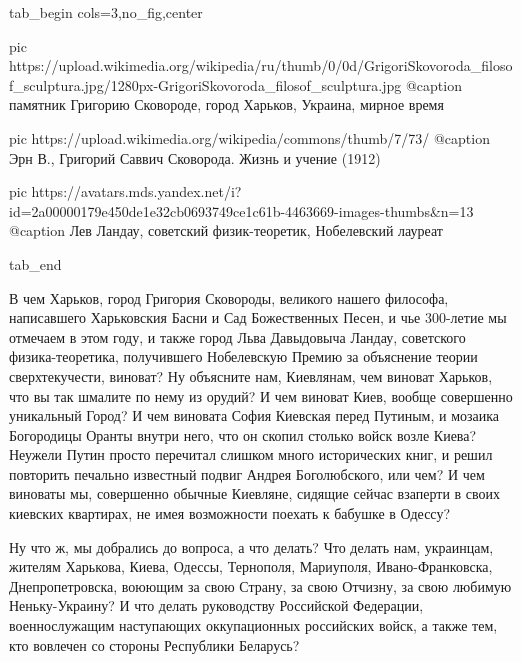\ifcmt
  tab_begin cols=3,no_fig,center

     pic https://upload.wikimedia.org/wikipedia/ru/thumb/0/0d/GrigoriSkovoroda_filosof_sculptura.jpg/1280px-GrigoriSkovoroda_filosof_sculptura.jpg
		 @caption памятник Григорию Сковороде, город Харьков, Украина, мирное время

		 pic https://upload.wikimedia.org/wikipedia/commons/thumb/7/73/%
		 @caption Эрн В., Григорий Саввич Сковорода. Жизнь и учение (1912)

		 pic https://avatars.mds.yandex.net/i?id=2a00000179e450de1e32cb0693749ce1c61b-4463669-images-thumbs&n=13
		 @caption Лев Ландау, советский физик-теоретик, Нобелевский лауреат

  tab_end
\fi

В чем Харьков, город Григория
Сковороды, великого нашего философа, написавшего Харьковския Басни и Сад
Божественных Песен, и чье 300-летие мы отмечаем в этом году, и также город Льва
Давыдовыча Ландау, советского физика-теоретика, получившего Нобелевскую Премию
за объяснение теории сверхтекучести, виноват? Ну объясните нам, Киевлянам, чем
виноват Харьков, что вы так шмалите по нему из орудий? И чем виноват Киев,
вообще совершенно уникальный Город? И чем виновата София Киевская перед
Путиным, и мозаика Богородицы Оранты внутри него, что он скопил столько войск
возле Киева?  Неужели Путин просто перечитал слишком много исторических книг, и
решил повторить печально известный подвиг Андрея Боголюбского, или чем? И чем
виноваты мы, совершенно обычные Киевляне, сидящие сейчас взаперти в своих
киевских квартирах, не имея возможности поехать к бабушке в Одессу?

Ну что ж, мы добрались до вопроса, а что делать? Что делать нам, украинцам,
жителям Харькова, Киева, Одессы, Тернополя, Мариуполя, Ивано-Франковска,
Днепропетровска, воюющим за свою Страну, за свою Отчизну, за свою любимую
Неньку-Украину? И что делать руководству Российской Федерации, военнослужащим
наступающих оккупационных российских войск, а также тем, кто вовлечен со
стороны Республики Беларусь?

